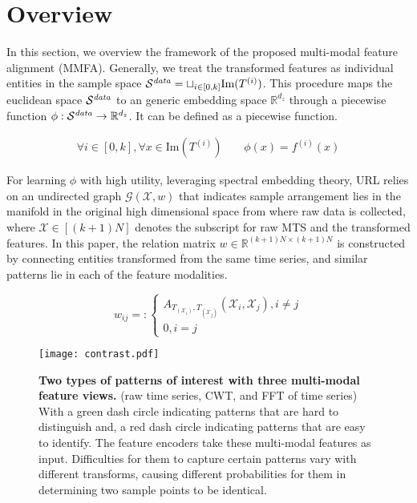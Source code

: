 \documentclass{article}
\begin{document}
\section{Overview}\label{sec:over}

In this section, we overview the framework of the proposed multi-modal feature alignment (MMFA). Generally, we treat the transformed features as individual entities in the sample space $\mathcal{S}^{\text{\textit{data}}} = \sqcup_{i \in [0,k]} \text{Im}(T^{(i)})$. This procedure maps the euclidean space $\mathcal{S}^{\text{\textit{data}}}$ to an generic embedding space $\mathbb{R}^{d_z}$ through a piecewise function $\phi: \mathcal{S}^{\text{\textit{data}}} \to \mathbb{R}^{d_z}$. It can be defined as a piecewise function. 


\begin{equation}
\begin{aligned}
        \forall i\in[0,k], \forall x \in \text{Im}(T^{(i)}) & \ \ \ \ \ \phi(x) = f^{(i)}(x)
\end{aligned}
\end{equation}

For learning $\phi$ with high utility, leveraging spectral embedding theory, URL relies on an undirected graph $\mathcal{G}(\mathcal{X}, w)$ that indicates sample arrangement lies in the manifold in the original high dimensional space from where raw data is collected, where $\mathcal{X}\in [(k + 1)N]$ denotes the subscript for raw MTS and the transformed features. In this paper, the relation matrix $w \in \mathbb{R}^{(k + 1)N \times (k + 1)N}$ is constructed by connecting entities transformed from the same time series, and similar patterns lie in each of the feature modalities. 

\begin{equation}\label{eq:graph_weight}
w_{ij} =:   \begin{cases}  A_{T_{(\mathcal{X}_i)}, T_{(\mathcal{X}_j)}}(\mathcal{X}_i, \mathcal{X}_j) , i \neq j \\
 0, i = j 
\end{cases}
\end{equation}


\begin{figure*}
    \centering
    \texttt{[image: contrast.pdf]}
    \caption{\textbf{Two types of patterns of interest with three multi-modal feature views.} (raw time series, CWT, and FFT of time series) With a green dash circle indicating patterns that are hard to distinguish and, a red dash circle indicating patterns that are easy to identify. The feature encoders take these multi-modal features as input. Difficulties for them to capture certain patterns vary with different transforms, causing different probabilities for them in determining two sample points to be identical.}
    \label{fig:contrast}
\end{figure*}
\end{document}
